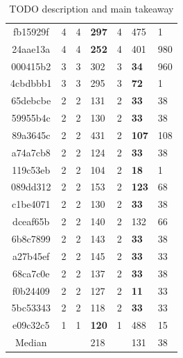 \begin{table}
\begin{tabular}{c | r | r l | r l | t }
        
        fb15929f &                  4 &            4    &  \textbf{297} & 4 & 475 & 1 \\ 
        24aae13a &                  4 &         4       &  \textbf{252 } & 4 & 401 & 980\\ 
        000415b2 &                  3 &         3       &  302 & 3 & \textbf{34} & 960 \\
        
        4cbdbbb1 &                  3 &          3      &  295 & 3 & \textbf{72} & 1\\ 
        65debcbe &                  2 &          2      &  131  & 2 & \textbf{33} & 38 \\ 
        59955b4c &                  2 &          2      &  130  & 2 & \textbf{33} & 38 \\
        
        
        89a3645c &                  2 &           2     &  431 & 2 & \textbf{107} & 108\\
        a74a7cb8 &                  2 &           2     &  124 & 2 & \textbf{33} & 38 \\
        119c53eb &                  2 &           2     &  104 & 2 & \textbf{18} & 1 \\
        
        089dd312 &                  2 &           2     &  153 & 2 & \textbf{123} & 68\\
        c1be4071 &                  2 &           2     &  130 & 2 & \textbf{33} & 38\\
        dceaf65b &                  2 &           2     &  140 & 2 & 132 & 66\\
        
        6b8c7899 &                  2 &            2    &  143 & 2 & \textbf{33} & 38 \\
        a27b45ef &                  2 &         2       &  145 & 2 & \textbf{33} & 33\\
        68ca7c0e &                  2 &         2       &  137  & 2 & \textbf{33} & 38\\
        
        f0b24409 &                  2 &         2       &  127  & 2 & \textbf{11} & 33 \\
        5bc53343 &                  2 &         2       &  118  & 2 & \textbf{33} & 33 \\
        e09c32c5 &                  1 &         1       &  \textbf{120}  & 1 & 488 & 15 \\
        \hline\hline
        Median &                         &         &      218  &   & 131 & 38
    \end{tabular}
    \caption{TODO description and main takeaway}
    \label{offensive:results:fast}
\end{table}

